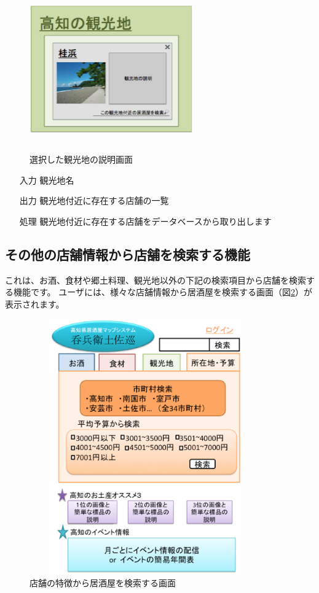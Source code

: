\documentclass[a4j,titlepage]{jarticle}
\begin{document}
\begin {figure}[htbp]
    \begin{center}
    \includegraphics [height=7cm, width=7cm]{extrnal_design_document_image/11.eps}
    \caption {選択した観光地の説明画面}
    \label {fig:11}
    \end{center}
\end {figure}

\begin{enumerate}
  \item [入力] 観光地名
  \item [出力] 観光地付近に存在する店舗の一覧
  \item [処理] 観光地付近に存在する店舗をデータベースから取り出します
\end{enumerate}

\newpage
\subsection{その他の店舗情報から店舗を検索する機能}
これは、お酒、食材や郷土料理、観光地以外の下記の検索項目から店舗を検索する機能です。
ユーザには、様々な店舗情報から居酒屋を検索する画面（図\ref{fig:12}）が表示されます。

\begin {figure}[htbp]
    \begin{center}
    \includegraphics [height=11cm, width=10cm]{extrnal_design_document_image/12.eps}
    \caption {店舗の特徴から居酒屋を検索する画面}
    \label {fig:12}
    \end{center}
\end {figure}
\end{document}
